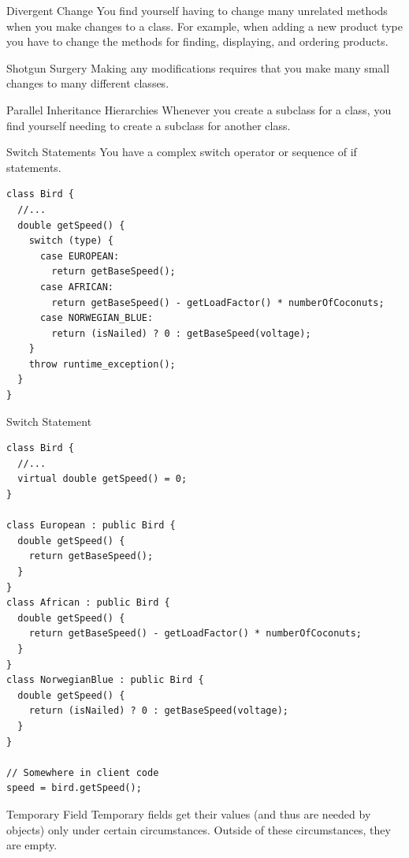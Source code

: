 \documentclass{beamer}
\begin{document}
\begin{frame}{Divergent Change}
You find yourself having to change many unrelated methods when you make changes
to a class. For example, when adding a new product type you have to change the
methods for finding, displaying, and ordering products. 
\end{frame}

\begin{frame}{Shotgun Surgery}
Making any modifications requires that you make many small changes to many
different classes.
\end{frame}

\begin{frame}{Parallel Inheritance Hierarchies}
Whenever you create a subclass for a class, you find yourself needing to create
a subclass for another class.
\end{frame}

\begin{frame}[fragile]{Switch Statements}
You have a complex switch operator or sequence of if statements.

\begin{lstlisting}
class Bird {
  //...
  double getSpeed() {
    switch (type) {
      case EUROPEAN:
        return getBaseSpeed();
      case AFRICAN:
        return getBaseSpeed() - getLoadFactor() * numberOfCoconuts;
      case NORWEGIAN_BLUE:
        return (isNailed) ? 0 : getBaseSpeed(voltage);
    }
    throw runtime_exception();
  }
}
\end{lstlisting}
\end{frame}

\begin{frame}[fragile]{Switch Statement}
\begin{lstlisting}
class Bird {
  //...
  virtual double getSpeed() = 0;
}

class European : public Bird {
  double getSpeed() {
    return getBaseSpeed();
  }
}
class African : public Bird {
  double getSpeed() {
    return getBaseSpeed() - getLoadFactor() * numberOfCoconuts;
  }
}
class NorwegianBlue : public Bird {
  double getSpeed() {
    return (isNailed) ? 0 : getBaseSpeed(voltage);
  }
}

// Somewhere in client code
speed = bird.getSpeed();
\end{lstlisting}
\end{frame}

\begin{frame}{Temporary Field}
Temporary fields get their values (and thus are needed by objects) only under
certain circumstances. Outside of these circumstances, they are empty.
\end{frame}
\end{document}
